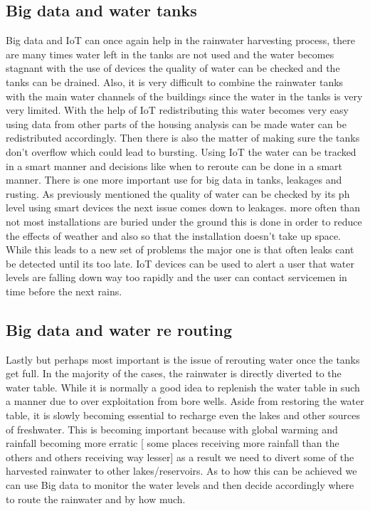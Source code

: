 \documentclass[sigconf]{acmart}
\begin{document}
\subsection{Big data and water tanks}
Big data and IoT can once again help in the rainwater harvesting process, there are many times water left in the tanks are not used and the water becomes stagnant with the use of devices the quality of water can be checked and the tanks can be drained. Also, it is very difficult to combine the rainwater tanks with the main water channels of the buildings since the water in the tanks is very very limited. With the help of IoT redistributing this water becomes very easy using data from other parts of the housing analysis can be made water can be redistributed accordingly. Then there is also the matter of making sure the tanks don't overflow which could lead to bursting. Using IoT the water can be tracked in a smart manner and decisions like when to reroute can be done in a smart manner. There is one more important use for big data in tanks, leakages and rusting. As previously mentioned the quality of water can be checked by its ph level using smart devices the next issue comes down to leakages. more often than not most installations are buried under the ground this is done in order to reduce the effects of weather and also so that the installation doesn't take up space. While this leads to a new set of problems the major one is that often leaks cant be detected until its too late. IoT devices can be used to alert a user that water levels are falling down way too rapidly and the user can contact servicemen in time before the next rains.

\subsection{Big data and water re routing}
Lastly but perhaps most important is the issue of rerouting water once the tanks get full. In the majority of the cases, the rainwater is directly diverted to the water table. While it is normally a good idea to replenish the water table in such a manner due to over exploitation from bore wells. Aside from restoring the water table, it is slowly becoming essential to recharge even the lakes and other sources of freshwater. This is becoming important because with global warming and rainfall becoming more erratic [ some places receiving more rainfall than the others and others receiving way lesser] as a result we need to divert some of the harvested rainwater to other lakes/reservoirs. As to how this can be achieved we can use Big data to monitor the water levels and then decide accordingly where to route the rainwater and by how much.
\end{document}
